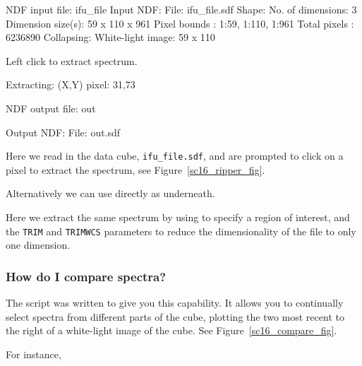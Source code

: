 \documentclass[twoside,11pt]{starlink}
\begin{document}
\begin{small}
\begin{terminalv}
NDF input file: ifu_file
     Input NDF:
       File: ifu_file.sdf
     Shape:
       No. of dimensions: 3
       Dimension size(s): 59 x 110 x 961
       Pixel bounds     : 1:59, 1:110, 1:961
       Total pixels     : 6236890
     Collapsing:
       White-light image: 59 x 110

 Left click to extract spectrum.

     Extracting:
       (X,Y) pixel: 31,73

NDF output file: out

     Output NDF:
       File: out.sdf
\end{terminalv}
\end{small}

Here we read in the data cube, \texttt{ifu\_file.sdf}, and are prompted
to click on a pixel to extract the spectrum, see
Figure~\ref{sc16_ripper_fig}.

Alternatively we can use  directly as
underneath.

\begin{small}
\begin{terminalv}
\end{terminalv}
\end{small}

Here we extract the same spectrum by using  to specify a region of interest, and the
\texttt{TRIM} and \texttt{TRIMWCS} parameters to reduce the dimensionality
of the file to only one dimension.

\subsubsection{How do I compare spectra?}

The  script was written to give you
this capability.  It allows you to continually select spectra from
different parts of the cube, plotting the two most recent to the right
of a white-light image of the cube.  See
Figure~\ref{sc16_compare_fig}.


For instance,
\end{document}

